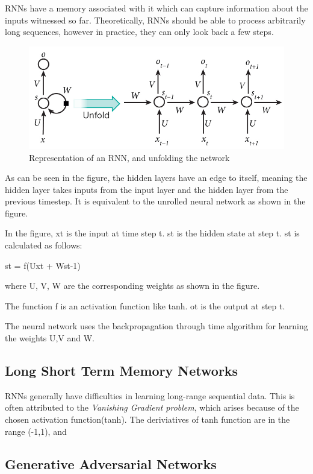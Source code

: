 \documentclass[11pt]{article}
\begin{document}
RNNs have a memory associated with it which can capture information about the inputs witnessed so far. Theoretically, RNNs should be able to process arbitrarily long sequences, however in practice, they can only look back a few steps.

\begin{figure}
  \includegraphics[width=\linewidth]{rnn.jpg}
  \caption{Representation of an RNN, and unfolding the network}
  \label{fig:rnn}
\end{figure}

As can be seen in the figure, the hidden layers have an edge to itself, meaning the hidden layer takes inputs from the input layer and the hidden layer from the previous timestep. It is equivalent to the unrolled neural network as shown in the figure.

In the figure, xt is the input at time step t. st is the hidden state at step t. st is calculated as follows:

st = f(Uxt + Wst-1)

where U, V, W are the corresponding weights as shown in the figure.

The function f is an activation function like tanh. ot is the output at step t.

The neural network uses the backpropagation through time algorithm for learning the weights U,V and W.

\subsection{Long Short Term Memory Networks}

RNNs generally have difficulties in learning long-range sequential data. This is often attributed to the \emph{Vanishing Gradient problem}, which arises because of the chosen activation function(tanh). The deriviatives of tanh function are in the range (-1,1), and 

\subsection{Generative Adversarial Networks}
\end{document}
